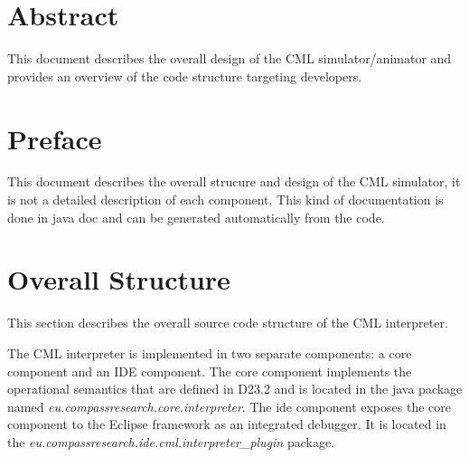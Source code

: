 \documentclass[a4paper, 12pt]{include/compassreport}   %
\begin{document}
\maketitle


\section*{Abstract}
\label{sec:abstract}

This document describes the overall design of the CML
simulator/animator and provides an overview of the code structure
targeting developers.

\newpage

\tableofcontents
\newpage

\section{Preface}
This document describes the overall strucure and design of the CML
simulator, it is not a detailed description of each component. This
kind of documentation is done in java doc and can be generated
automatically from the code.



\section{Overall Structure}
\label{sec:introduction}
This section describes the overall source code structure of the CML
interpreter.  

The CML interpreter is implemented in two separate components:  a core
component and an IDE component.  The core component implements the
operational semantics that are defined in D23.2 and is located in the
java package named \emph{eu.compassresearch.core.interpreter}. The ide
component exposes the core component to the Eclipse framework as an
integrated debugger. It is located in the
\emph{eu.compassresearch.ide.cml.interpreter\_plugin} package.
\end{document}
